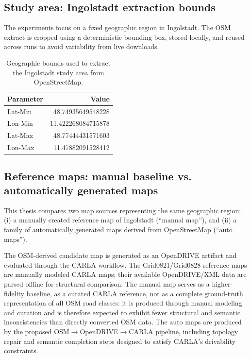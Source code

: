 \subsection{Study area: Ingolstadt extraction bounds}
\label{sec:study_area}
The experiments focus on a fixed geographic region in Ingolstadt. The OSM extract is cropped using a deterministic bounding box, stored locally, and reused across runs to avoid variability from live downloads.


\begin{table}[ht]
\centering
\caption{Geographic bounds used to extract the Ingolstadt study area from OpenStreetMap.}
\label{tab:ingolstadt_bbox}
\begin{tabular}{l r}
\hline
Parameter & Value \\
\hline
Lat-Min & 48.74935649548228 \\
Lon-Min & 11.422268084715878 \\
Lat-Max & 48.77444431571603 \\
Lon-Max & 11.47882091528412 \\
\hline
\end{tabular}
\end{table}

\subsection{Reference maps: manual baseline vs. automatically generated maps}
\label{sec:reference_maps}
This thesis compares two map sources representing the same geographic region:\newline
(i) a manually created reference map of Ingolstadt (``manual map''), and\newline
(ii) a family of automatically generated maps derived from OpenStreetMap (``auto maps'').

The OSM-derived candidate map is generated as an OpenDRIVE artifact and evaluated through the CARLA workflow. The Grid0821/Grid0828 reference maps are manually modeled CARLA maps; their available OpenDRIVE/XML data are parsed offline for structural comparison. The manual map serves as a higher-fidelity baseline, as a curated CARLA reference, not as a complete ground-truth representation of all OSM road classes: it is produced through manual modeling and curation and is therefore expected to exhibit fewer structural and semantic inconsistencies than directly converted OSM data. The auto maps are produced by the proposed OSM$\rightarrow$OpenDRIVE$\rightarrow$CARLA pipeline, including topology repair and semantic completion steps designed to satisfy CARLA's drivability constraints.

